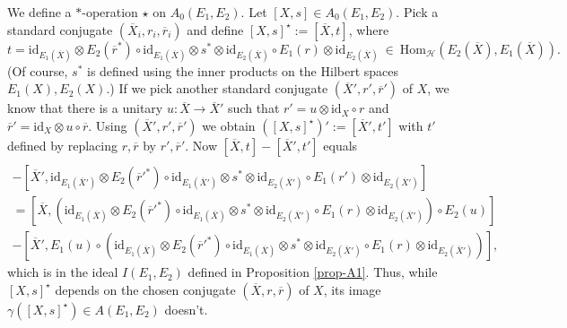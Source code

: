 \documentclass[12pt]{article}
\theoremstyle{definition}
\theoremstyle{definition}
\theoremstyle{remark}
\def\2#1{{\mathcal #1}}
\def\ol#1{{\overline #1}}
\newcommand{\Hom}{\mathrm{Hom}}
\newcommand{\mcirc}{\circ}
\newcommand{\rarr}{\rightarrow}
\def\id{\mathrm{id}}
\begin{document}
\prf We define a $*$-operation $\star$ on $A_0(E_1,E_2)$. Let $[X,s]\in A_0(E_1,E_2)$. 
Pick a standard conjugate $(\ol{X_i},r_i,\ol{r}_i)$ and define $[X,s]^\star:=[\ol{X},t]$, where 
\[ t= \id_{E_1(\ol{X})} \otimes E_2(\ol{r}^*)\mcirc \id_{E_1(\ol{X})} \otimes
    s^*\otimes\id_{E_2(\ol{X})}  \mcirc E_1(r)\otimes \id_{E_2(\ol{X})} 
   \ \in \ \Hom_\2H(E_2(\ol{X}),E_1(\ol{X})). \]
(Of course, $s^*$ is defined using the inner products on the Hilbert spaces $E_1(X),E_2(X)$.)
If we pick another standard conjugate $(\ol{X}',r',\ol{r}')$ of $X$, we know that there is a unitary
$u:\ol{X}\rarr\ol{X}'$ such that $r'=u\otimes\id_X\mcirc r$ and $\ol{r}'=\id_X\otimes u\mcirc\ol{r}$. Using
$(\ol{X}',r',\ol{r}')$ we obtain $([X,s]^\star)':=[\ol{X}',t']$ with $t'$ defined by replacing
$r,\ol{r}$ by $r',\ol{r}'$. Now $[\ol{X},t]-[\ol{X}',t']$ equals 
\begin{multline*} [\ol{X},\id_{E_1(\ol{X})} \otimes E_2(\ol{r}^*)\mcirc
    \id_{E_1(\ol{X})} \otimes  s^*\otimes\id_{E_2(\ol{X})} \mcirc E_1(r)\otimes \id_{E_2(\ol{X})}] \\
     -[\ol{X}',\id_{E_1(\ol{X}')} \otimes E_2({\ol{r}'}^*)\mcirc \id_{E_1(\ol{X}')} \otimes
    s^*\otimes\id_{E_2(\ol{X}')}  \mcirc E_1(r')\otimes \id_{E_2(\ol{X}')} ] \\ 
 = [\ol{X}, ( \id_{E_1(\ol{X})} \otimes E_2({\ol{r}'}^*)\mcirc \id_{E_1(\ol{X})} \otimes  
    s^*\otimes\id_{E_2(\ol{X}')} \mcirc E_1(r)\otimes \id_{E_2(\ol{X}')} )\mcirc E_2(u)] \\
     -[\ol{X}', E_1(u)\mcirc( \id_{E_1(\ol{X})} \otimes E_2({\ol{r}'}^*) \mcirc \id_{E_1(\ol{X})} 
   \otimes s^*\otimes\id_{E_2(\ol{X}')} \mcirc E_1(r)\otimes \id_{E_2(\ol{X}')} )], 
\end{multline*}
which is in the ideal $I(E_1,E_2)$ defined in Proposition \ref{prop-A1}. Thus, while $[X,s]^\star$
depends on the chosen conjugate $(\ol{X},r,\ol{r})$ of $X$, its image 
$\gamma([X,s]^\star)\in A(E_1,E_2)$ doesn't. 
\end{document}
